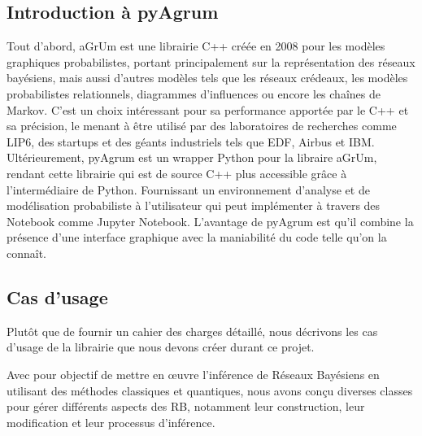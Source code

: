 \subsection{Introduction à pyAgrum}

Tout d’abord, aGrUm est une librairie C++ créée en 2008 pour les modèles graphiques probabilistes, portant principalement sur la représentation des réseaux bayésiens, mais aussi d’autres modèles tels que les réseaux crédeaux, les modèles probabilistes relationnels, diagrammes d’influences ou encore les chaînes de Markov. C’est un choix intéressant pour sa performance apportée par le C++ et sa précision, le menant à être utilisé par des laboratoires de recherches comme LIP6, des startups et des géants industriels tels que EDF, Airbus et IBM.
\\
Ultérieurement, pyAgrum est un wrapper Python pour la libraire aGrUm, rendant cette librairie qui est de source C++ plus accessible grâce à l’intermédiaire de Python. Fournissant un environnement d’analyse et de modélisation probabiliste à l’utilisateur qui peut implémenter à travers des Notebook comme Jupyter Notebook. L’avantage de pyAgrum est qu’il combine la présence d'une interface graphique avec la maniabilité du code telle qu’on la connaît.

\subsection{Cas d'usage}

Plutôt que de fournir un cahier des charges détaillé, nous décrivons les cas d'usage de la librairie que nous devons créer durant ce projet.

Avec pour objectif de mettre en œuvre l'inférence de Réseaux Bayésiens en utilisant des méthodes classiques et quantiques, nous avons conçu diverses classes pour gérer différents aspects des RB, notamment leur construction, leur modification et leur processus d'inférence.

